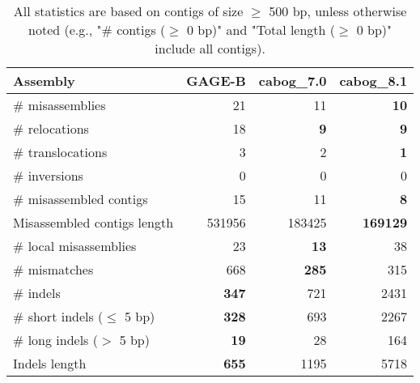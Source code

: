 \documentclass[12pt,a4paper]{article}
\begin{document}
\begin{table}[ht]
\begin{center}
\caption{All statistics are based on contigs of size $\geq$ 500 bp, unless otherwise noted (e.g., "\# contigs ($\geq$ 0 bp)" and "Total length ($\geq$ 0 bp)" include all contigs).}
\begin{tabular}{|l*{3}{|r}|}
\hline
Assembly & GAGE-B & cabog\_7.0 & cabog\_8.1 \\ \hline
\# misassemblies & 21 & 11 & {\bf 10} \\ \hline
\hspace{5mm}\# relocations & 18 & {\bf 9} & {\bf 9} \\ \hline
\hspace{5mm}\# translocations & 3 & 2 & {\bf 1} \\ \hline
\hspace{5mm}\# inversions & 0 & 0 & 0 \\ \hline
\# misassembled contigs & 15 & 11 & {\bf 8} \\ \hline
Misassembled contigs length & 531956 & 183425 & {\bf 169129} \\ \hline
\# local misassemblies & 23 & {\bf 13} & 38 \\ \hline
\# mismatches & 668 & {\bf 285} & 315 \\ \hline
\# indels & {\bf 347} & 721 & 2431 \\ \hline
\hspace{5mm}\# short indels ($\leq$ 5 bp) & {\bf 328} & 693 & 2267 \\ \hline
\hspace{5mm}\# long indels ($>$ 5 bp) & {\bf 19} & 28 & 164 \\ \hline
Indels length & {\bf 655} & 1195 & 5718 \\ \hline
\end{tabular}
\end{center}
\end{table}
\end{document}
